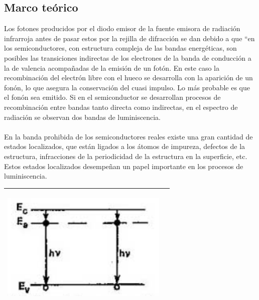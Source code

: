 \documentclass[12]{article}
\newenvironment{Figure}
{\par\medskip\noindent\minipage{\linewidth}}
{\endminipage\par\medskip}
\begin{document}
\begin{multicols}{2}
\section{Marco teórico}
Los fotones producidos por el diodo emisor de la fuente emisora de radiación infrarroja antes de pasar estos por la rejilla de difracción se dan debido a que “en los semiconductores, con estructura compleja de las bandas energéticas, son posibles las transiciones indirectas de los electrones de la banda de conducción  a la de valencia acompañadas de la emisión de un fotón. En este caso la recombinación del electrón libre con el hueco se desarrolla con la aparición de un fonón, lo que asegura la conservación del cuasi impulso. Lo más probable es que el fonón sea emitido. Si en el semiconductor se desarrollan procesos de recombinación entre bandas  tanto directa como indirectas, en el espectro de radiación se observan dos bandas de luminiscencia. \\ \\
En la banda prohibida de los semiconductores reales existe una gran cantidad de estados localizados, que están ligados a los átomos de impureza, defectos de la estructura, infracciones de la periodicidad de la estructura en la superficie, etc. Estos estados localizados desempeñan un papel importante  en los procesos de luminiscencia. 
\begin{Figure}	
\center
\begin{tabular}{|l|r|}
\hline
\includegraphics[width=8cm, height=6cm]{img/transiciones.png} \\ \hline
\end{tabular}
\label{fig:g1}
\end{Figure}

\end{multicols}
\end{document}
